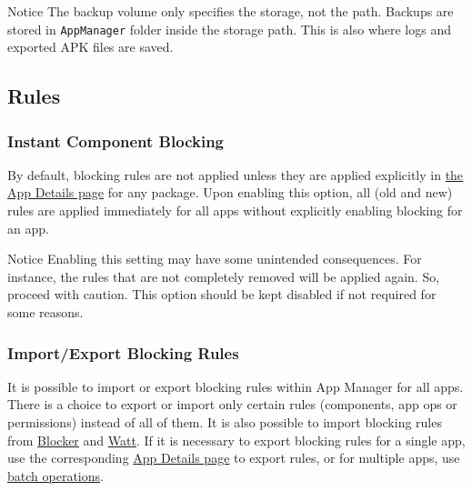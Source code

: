 \begin{tip}{Notice}
    The backup volume only specifies the storage, not the path.
    Backups are stored in \texttt{AppManager} folder inside the storage path.
    This is also where logs and exported APK files are saved.
\end{tip}

\subsection{Rules}\label{subsec:rules} %

\subsubsection{Instant Component Blocking}\label{subsubsec:instant-component-blocking} %
By default, blocking rules are not applied unless they are applied explicitly in \hyperref[sec:app-details-page]{the App
Details page} for any package.
Upon enabling this option, all (old and new) rules are applied immediately for all apps without explicitly enabling
blocking for an app.

\begin{warning}{Notice}
    Enabling this setting may have some unintended consequences.
    For instance, the rules that are not completely removed will be applied again.
    So, proceed with caution.
    This option should be kept disabled if not required for some reasons.
\end{warning}


\subsubsection{Import/Export Blocking Rules} %
It is possible to import or export blocking rules within App Manager for all apps.
There is a choice to export or import only certain rules (components, app ops or permissions) instead of all of them.
It is also possible to import blocking rules from \href{https://github.com/lihenggui/blocker}{Blocker} and
\href{https://github.com/tuyafeng/Watt}{Watt}.
If it is necessary to export blocking rules for a single app, use the corresponding \hyperref[sec:app-details-page]{App
Details page} to export rules, or for multiple apps, use \hyperref[subsec:batch-operations]{batch operations}.

